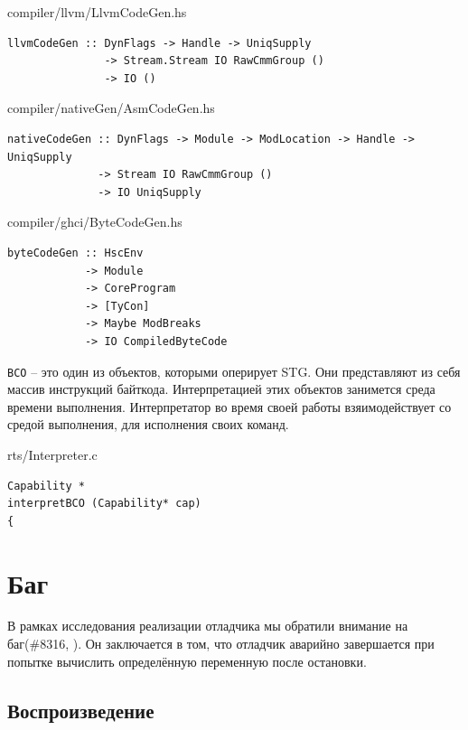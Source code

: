 \documentclass[fontsize=14pt, paper=a4, pagesize, DIV=calc]{scrartcl}
\def\code#1{\texttt{#1}}
\begin{document}
\begin{ListingEnv}
\caption{compiler/llvm/LlvmCodeGen.hs}
\begin{lstlisting}[firstnumber=44]
llvmCodeGen :: DynFlags -> Handle -> UniqSupply
               -> Stream.Stream IO RawCmmGroup ()
               -> IO ()
\end{lstlisting}
\end{ListingEnv}

\begin{ListingEnv}
\caption{compiler/nativeGen/AsmCodeGen.hs}
\begin{lstlisting}[firstnumber=108]
nativeCodeGen :: DynFlags -> Module -> ModLocation -> Handle -> UniqSupply
              -> Stream IO RawCmmGroup ()
              -> IO UniqSupply
\end{lstlisting}
\end{ListingEnv}

\begin{ListingEnv}
\caption{compiler/ghci/ByteCodeGen.hs}
\begin{lstlisting}[firstnumber=81]
byteCodeGen :: HscEnv
            -> Module
            -> CoreProgram
            -> [TyCon]
            -> Maybe ModBreaks
            -> IO CompiledByteCode
\end{lstlisting}
\end{ListingEnv}

\code{BCO} -- это один из объектов, которыми оперирует STG. Они представляют из
себя массив инструкций байткода. Интерпретацией этих объектов занимется среда
времени выполнения. Интерпретатор во время своей работы взяимодействует со
средой выполнения, для исполнения своих команд.

\begin{ListingEnv}
\caption{rts/Interpreter.c}
\begin{lstlisting}[firstnumber=295]
Capability *
interpretBCO (Capability* cap)
{
\end{lstlisting}
\end{ListingEnv}

\section{Баг}

В рамках исследования реализации отладчика мы обратили внимание на баг(\#{}8316,
\cite{bug}). Он заключается в том, что отладчик аварийно завершается при попытке
вычислить определённую переменную после остановки.

\subsection{Воспроизведение}
\end{document}
